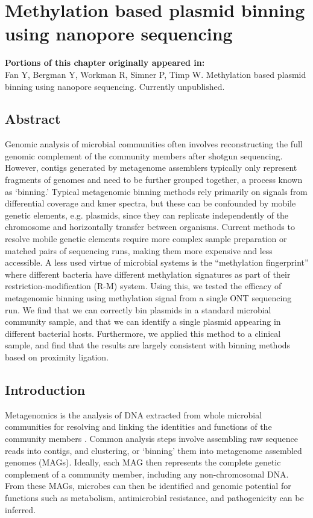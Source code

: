\chapter{Methylation based plasmid binning using nanopore sequencing}
\label{chap:mdr}

\textbf{Portions of this chapter originally appeared in:} \\
Fan Y, Bergman Y, Workman R, Simner P, Timp W. Methylation based plasmid binning using nanopore sequencing. Currently unpublished.

\section{Abstract}
\label{sec:abstract}

Genomic analysis of microbial communities often involves reconstructing the full genomic complement of the community members after shotgun sequencing. However, contigs generated by metagenome assemblers typically only represent fragments of genomes and need to be further grouped together, a process known as ‘binning.’ Typical metagenomic binning methods rely primarily on signals from differential coverage and kmer spectra, but these can be confounded by mobile genetic elements, e.g. plasmids, since they can replicate independently of the chromosome and horizontally transfer between organisms. Current methods to resolve mobile genetic elements require more complex sample preparation or matched pairs of sequencing runs, making them more expensive and less accessible. A less used virtue of microbial systems is the “methylation fingerprint” where different bacteria have different methylation signatures as part of their restriction-modification (R-M) system. Using this, we tested the efficacy of metagenomic binning using methylation signal from a single ONT sequencing run. We find that we can correctly bin plasmids in a standard microbial community sample, and that we can identify a single plasmid appearing in different bacterial hosts. Furthermore, we applied this method to a clinical sample, and find that the results are largely consistent with binning methods based on proximity ligation.

\section{Introduction}
\label{sec:intro}

Metagenomics is the analysis of DNA extracted from whole microbial communities for resolving and linking the identities and functions of the community members \citep{Strous2012-nm}. Common analysis steps involve assembling raw sequence reads into contigs, and clustering, or ‘binning’ them into metagenome assembled genomes (MAGs). Ideally, each MAG then represents the complete genetic complement of a community member, including any non-chromosomal DNA. From these MAGs, microbes can then be identified and genomic potential for functions such as metabolism, antimicrobial resistance, and pathogenicity can be inferred.

